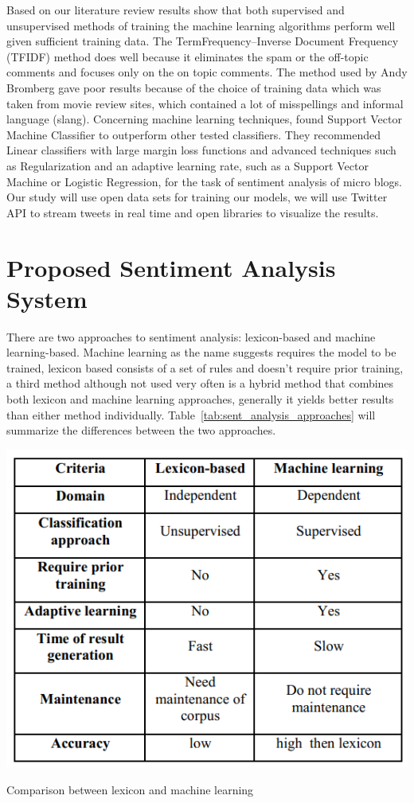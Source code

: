 Based on our literature review results show that both supervised and unsupervised methods of
training the machine learning algorithms perform well given sufficient training data. The TermFrequency–Inverse Document Frequency (TFIDF) method does well because it eliminates the
spam or the off-topic comments and focuses only on the on topic comments. The method used by
Andy Bromberg gave poor results because of the choice of training data which was taken from
movie review sites, which contained a lot of misspellings and informal language (slang).
Concerning machine learning techniques, \cite{ref41} found Support Vector
Machine Classifier to outperform other tested classifiers. They recommended Linear classifiers
with large margin loss functions and advanced techniques such as Regularization and an adaptive
learning rate, such as a Support Vector Machine or Logistic Regression, for the task of sentiment
analysis of micro blogs.\\
Our study will use open data sets for training our models, we will use Twitter API to stream tweets in real time and open libraries to visualize the results.


\chapter{Proposed Sentiment Analysis System}

There are two approaches to sentiment analysis: lexicon-based and machine learning-based.
%
Machine learning as the name suggests requires the model to be trained, lexicon based consists of a set of rules and doesn’t require prior training, a third method although not used very often is a hybrid method that combines both lexicon and machine learning approaches, generally it yields better results than either method individually.\cite{ref2}
%
Table~\ref{tab:sent_analysis_approaches} will summarize the differences between the two approaches.

\begin{table}[h]
  \centering
  \includegraphics[width=0.5\linewidth]{images/lex_vs_ml.png}
  \caption{Comparison between lexicon and machine learning}
  \label{tab:sent_analysis_approaches}
\end{table}


